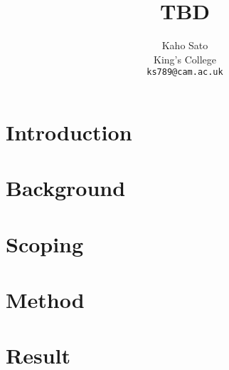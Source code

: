 \documentclass[11pt]{article}
\title{TBD}
\author{Kaho Sato \\
King's College \\
  {\tt ks789@cam.ac.uk}}
\date{}
\begin{document}

\section{Introduction}
\label{sec:introduction}


\section{Background}
\label{sec:background}


\section{Scoping}
\label{sec:scoping}


\section{Method}
\label{sec:method}


\section{Result}
\label{sec:result}




\end{document}
